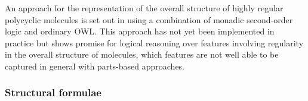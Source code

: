 \documentclass[10pt]{bmc_article}
\newenvironment{bmcformat}{\baselineskip20pt\sloppy\setboolean{publ}{false}}{\baselineskip20pt\sloppy}
\begin{document}
\begin{bmcformat}
% 
%  
% 
 
An approach for the representation of the overall structure of highly regular polycyclic molecules is set out in \cite{hastings2011} using a combination of monadic second-order logic and ordinary OWL.  This approach has not yet been implemented in practice but shows promise for logical reasoning over features involving regularity in the overall structure of molecules, which features are not well able to be captured in general with parts-based approaches. 
  
\subsubsection*{Structural formulae}  
\label{subsubsec:entire}


\end{bmcformat}
\end{document}
